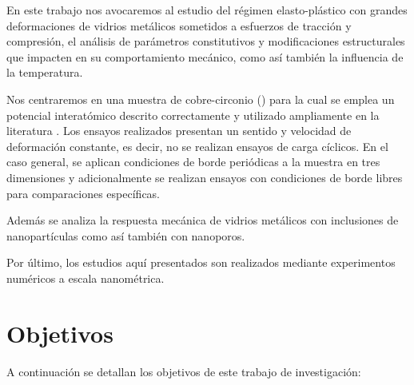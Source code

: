 En este trabajo nos avocaremos al estudio del régimen elasto-plástico con grandes deformaciones de vidrios metálicos sometidos a esfuerzos de tracción y compresión, el análisis de parámetros constitutivos y modificaciones estructurales que impacten en su comportamiento mecánico, como así también la influencia de la temperatura.

Nos centraremos en una muestra de cobre-circonio (\CuZr) para la cual se emplea un potencial interatómico descrito correctamente \citep{daw84} y utilizado ampliamente en la literatura \citep{shimizu07,cao09,cheng09,arman10,cheng11,wang12}. Los ensayos realizados presentan un sentido y velocidad de deformación constante, es decir, no se realizan ensayos de carga cíclicos. En el caso general, se aplican condiciones de borde periódicas a la muestra en tres dimensiones y adicionalmente se realizan ensayos con condiciones de borde libres para comparaciones específicas.

Además se analiza la respuesta mecánica de vidrios metálicos con inclusiones de nanopartículas como así también con nanoporos.

Por último, los estudios aquí presentados son realizados mediante experimentos numéricos a escala nanométrica.



\section{Objetivos}
\label{S1_4}

A continuación se detallan los objetivos de este trabajo de investigación:

